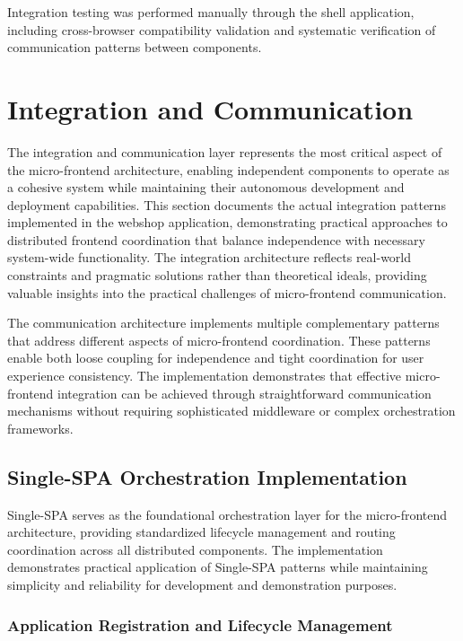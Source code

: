 \documentclass[12pt,a4paper]{report}
\begin{document}
Integration testing was performed manually through the shell application, including cross-browser compatibility validation and systematic verification of communication patterns between components.

\section{Integration and Communication}

The integration and communication layer represents the most critical aspect of the micro-frontend architecture, enabling independent components to operate as a cohesive system while maintaining their autonomous development and deployment capabilities. This section documents the actual integration patterns implemented in the webshop application, demonstrating practical approaches to distributed frontend coordination that balance independence with necessary system-wide functionality. The integration architecture reflects real-world constraints and pragmatic solutions rather than theoretical ideals, providing valuable insights into the practical challenges of micro-frontend communication.

The communication architecture implements multiple complementary patterns that address different aspects of micro-frontend coordination. These patterns enable both loose coupling for independence and tight coordination for user experience consistency. The implementation demonstrates that effective micro-frontend integration can be achieved through straightforward communication mechanisms without requiring sophisticated middleware or complex orchestration frameworks.

\subsection{Single-SPA Orchestration Implementation}

Single-SPA serves as the foundational orchestration layer for the micro-frontend architecture, providing standardized lifecycle management and routing coordination across all distributed components. The implementation demonstrates practical application of Single-SPA patterns while maintaining simplicity and reliability for development and demonstration purposes.

\subsubsection{Application Registration and Lifecycle Management}
\end{document}
